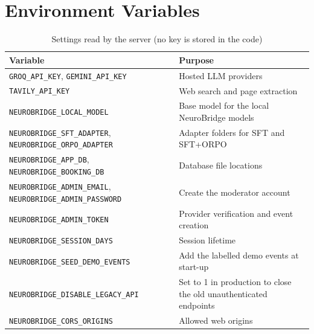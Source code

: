 \documentclass[11pt,a4paper]{article}
\newcommand{\code}[1]{\texttt{#1}}
\begin{document}
\section{Environment Variables}\label{app:env}
\begin{table}[H]
\centering
\caption{Settings read by the server (no key is stored in the code)}
\label{tab:envvars}
\small
\begin{tabularx}{\textwidth}{@{}lY@{}}
\toprule
\textbf{Variable} & \textbf{Purpose}\\
\midrule
\code{GROQ\_API\_KEY}, \code{GEMINI\_API\_KEY} & Hosted LLM providers\\
\code{TAVILY\_API\_KEY} & Web search and page extraction\\
\code{NEUROBRIDGE\_LOCAL\_MODEL} & Base model for the local NeuroBridge models\\
\code{NEUROBRIDGE\_SFT\_ADAPTER}, \code{NEUROBRIDGE\_ORPO\_ADAPTER} & Adapter folders for SFT and SFT+ORPO\\
\code{NEUROBRIDGE\_APP\_DB}, \code{NEUROBRIDGE\_BOOKING\_DB} & Database file locations\\
\code{NEUROBRIDGE\_ADMIN\_EMAIL}, \code{NEUROBRIDGE\_ADMIN\_PASSWORD} & Create the moderator account\\
\code{NEUROBRIDGE\_ADMIN\_TOKEN} & Provider verification and event creation\\
\code{NEUROBRIDGE\_SESSION\_DAYS} & Session lifetime\\
\code{NEUROBRIDGE\_SEED\_DEMO\_EVENTS} & Add the labelled demo events at start-up\\
\code{NEUROBRIDGE\_DISABLE\_LEGACY\_API} & Set to 1 in production to close the old unauthenticated endpoints\\
\code{NEUROBRIDGE\_CORS\_ORIGINS} & Allowed web origins\\
\bottomrule
\end{tabularx}
\end{table}
\end{document}
